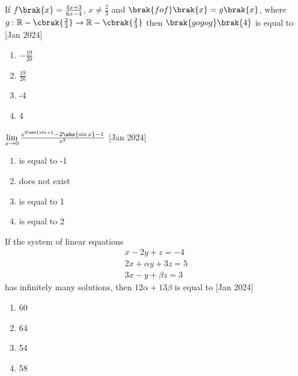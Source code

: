 \item If $f\brak{x} = \frac{4x+3}{6x-4}$, $x \ne \frac{2}{3}$ and
    $\brak{fof}\brak{x} = g\brak{x}$, where $g:\mathbb{R} - \cbrak{\frac{2}{3}} \to
    \mathbb{R} - \cbrak{\frac{2}{3}}$ then $\brak{gogog}\brak{4}$ is equal to
    \hfill{[Jan 2024]}

    \begin{multicols}{4}
        \begin{enumerate}

            \item $-\frac{19}{20}$
            \item $\frac{19}{20}$
            \item -4
            \item 4
        \end{enumerate}
    \end{multicols}

\item $\lim\limits_{x \to 0} \frac{e^{2\abs{\sin x}} - 2\abs{\sin x} - 1}{x^2}$
    \hfill{[Jan 2024]}

    \begin{multicols}{4}
        \begin{enumerate}

            \item is equal to -1 
            \item does not exist
            \item is equal to 1 
            \item is equal to 2 
        \end{enumerate}
    \end{multicols}

\item If the system of linear equations
    \begin{align*}
        x - 2y + z = -4 \\
        2x + \alpha y + 3z = 5 \\
        3x - y + \beta z = 3
    \end{align*}
    has infinitely many solutions, then $12\alpha + 13\beta$ is equal to
    \hfill{[Jan 2024]}

    \begin{multicols}{4}
        \begin{enumerate}

            \item 60
            \item 64
            \item 54
            \item 58
        \end{enumerate}
    \end{multicols}

